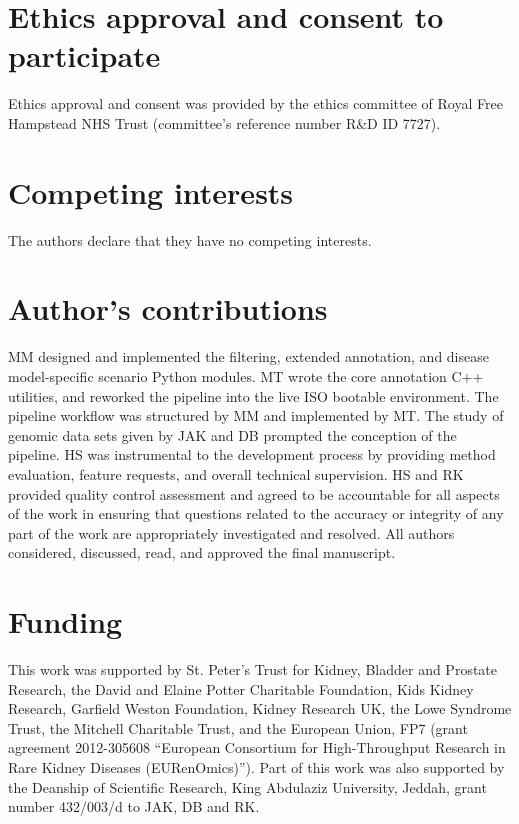 \documentclass[twocolumn]{bmcart}%
\begin{document}
\begin{backmatter}
\section*{Ethics approval and consent to participate}
Ethics approval and consent was provided by the ethics committee of Royal Free Hampstead NHS Trust (committee's reference number R\&D ID 7727).

\section*{Competing interests}
The authors declare that they have no competing interests.

\section*{Author's contributions}
MM designed and implemented the filtering, extended annotation, and disease model-specific scenario Python modules. MT wrote the core annotation C++ utilities, and reworked the pipeline into the live ISO bootable environment. The pipeline workflow was structured by MM and implemented by MT. The study of genomic data sets given by JAK and DB prompted the conception of the pipeline. HS was instrumental to the development process by providing method evaluation, feature requests, and overall technical supervision. HS and RK provided quality control assessment and agreed to be accountable for all aspects of the work in ensuring that questions related to the accuracy or integrity of any part of the work are appropriately investigated and resolved. All authors considered, discussed, read, and approved the final manuscript.



\section*{Funding}
This work was supported by St. Peter's Trust for Kidney, Bladder and Prostate Research, the David and Elaine Potter Charitable Foundation, Kids Kidney Research, Garfield Weston Foundation, Kidney Research UK, the Lowe Syndrome Trust, the Mitchell Charitable Trust, and the European Union, FP7 (grant agreement 2012-305608 ``European Consortium for High-Throughput Research in Rare Kidney Diseases (EURenOmics)''). Part of this work was also supported by the Deanship of Scientific Research, King Abdulaziz University, Jeddah, grant number 432/003/d to JAK, DB and RK.



\end{backmatter}
\end{document}
